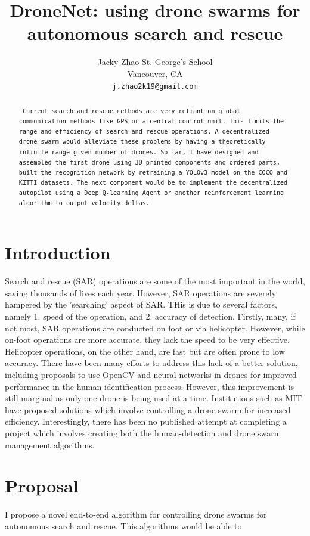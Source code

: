 \documentclass{article}
\title{DroneNet: using drone swarms for autonomous search and rescue}
\author{
  Jacky Zhao
  St. George's School\\
  Vancouver, CA\\
  \texttt{j.zhao2k19@gmail.com} \\
}
\begin{document}
\maketitle

\begin{abstract}
\texttt{
Current search and rescue methods are very reliant on global communication methods like GPS or a central control unit. This limits the range and efficiency of search and rescue operations. A decentralized drone swarm would alleviate these problems by having a theoretically infinite range given number of drones. So far, I have designed and assembled the first drone using 3D printed components and ordered parts, built the recognition network by retraining a YOLOv3 model on the COCO and KITTI datasets. The next component would be to implement the decentralized autopilot using a Deep Q-learning Agent or another reinforcement learning algorithm to output velocity deltas. 
} \\
\end{abstract}


\section{Introduction}
Search and rescue (SAR) operations are some of the most important in the world, saving thousands of lives each year. However, SAR operations are severely hampered by the 'searching' aspect of SAR. THis is due to several factors, namely 1. speed of the operation, and 2. accuracy of detection. Firstly, many, if not most, SAR operations are conducted on foot or via helicopter. However, while on-foot operations are more accurate, they lack the speed to be very effective. Helicopter operations, on the other hand, are fast but are often prone to low accuracy. There have been many efforts to address this lack of a better solution, including proposals to use OpenCV and neural networks in drones for improved performance in the human-identification process. However, this improvement is still marginal as only one drone is being used at a time. Institutions such as MIT have proposed solutions which involve controlling a drone swarm for increased efficiency. Interestingly, there has been no published attempt at completing a project which involves creating both the human-detection and drone swarm management algorithms.

\section{Proposal}
\label{sec:headings}
I propose a novel end-to-end algorithm for controlling drone swarms for autonomous search and rescue. This algorithms would be able to
\end{document}
